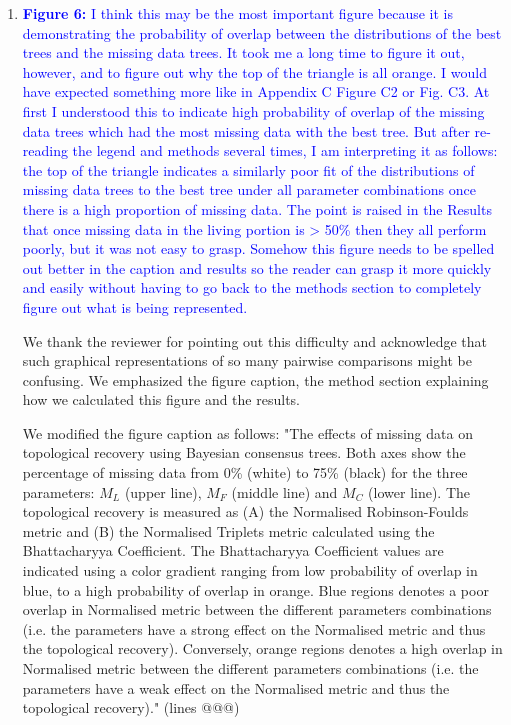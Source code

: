 \documentclass[12pt,letterpaper]{article}
\begin{document}
\begin{enumerate}
\item{\textcolor{blue}{\textbf{Figure 6:} I think this may be the most important figure because it is demonstrating the probability of overlap between the distributions of the best trees and the missing data trees.
It took me a long time to figure it out, however, and to figure out why the top of the triangle is all orange.
I would have expected something more like in Appendix C Figure C2 or Fig. C3.
At first I understood this to indicate high probability of overlap of the missing data trees which had the most missing data with the best tree.
But after re-reading the legend and methods several times, I am interpreting it as follows: the top of the triangle indicates a similarly poor fit of the distributions of missing data trees to the best tree under all parameter combinations once there is a high proportion of missing data.
The point is raised in the Results that once missing data in the living portion is > 50\% then they all perform poorly, but it was not easy to grasp.
Somehow this figure needs to be spelled out better in the caption and results so the reader can grasp it more quickly and easily without having to go back to the methods section to completely figure out what is being represented.}}

We thank the reviewer for pointing out this difficulty and acknowledge that such graphical representations of so many pairwise comparisons might be confusing.
We emphasized the figure caption, the method section explaining how we calculated this figure and the results.

We modified the figure caption as follows:
"The effects of missing data on topological recovery using Bayesian consensus trees. Both axes show the percentage of missing data from 0\% (white) to 75\% (black) for the three parameters: $M_{L}$ (upper line), $M_{F}$ (middle line) and $M_{C}$ (lower line). The topological recovery is measured as (A) the Normalised Robinson-Foulds metric and (B) the Normalised Triplets metric calculated using the Bhattacharyya Coefficient. The Bhattacharyya Coefficient values are indicated using a color gradient ranging from low probability of overlap in blue, to a high probability of overlap in orange. Blue regions denotes a poor overlap in Normalised metric between the different parameters combinations (i.e. the parameters have a strong effect on the Normalised metric and thus the topological recovery). Conversely, orange regions denotes a high overlap in Normalised metric between the different parameters combinations (i.e. the parameters have a weak effect on the Normalised metric and thus the topological recovery)." (lines @@@)


\end{enumerate}
\end{document}
